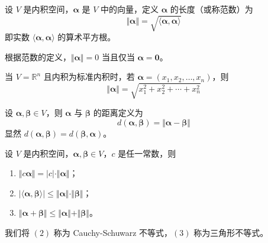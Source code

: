\begin{definition}
    设 $V$ 是内积空间，$\bm{\alpha}$ 是 $V$ 中的向量，定义 $\bm{\alpha}$ 的长度（或称范数）为
    \[
        \Vert \bm{\alpha} \Vert = \sqrt{\langle \bm{\alpha}, \bm{\alpha} \rangle}
    \]
    即实数 $\langle \bm{\alpha}, \bm{\alpha} \rangle$ 的算术平方根。
\end{definition}

\begin{remark}
    根据范数的定义，$\Vert \bm{\alpha} \Vert = 0$ 当且仅当 $\bm{\alpha} = \bm{0}$。
\end{remark}

\begin{remark}
    当 $V = \mathbb{R}^n$ 且内积为标准内积时，若 $\bm{\alpha} = (x_1, x_2, \ldots, x_n)$，则
    \[
        \Vert \bm{\alpha} \Vert = \sqrt{x_{1}^{2} + x_{2}^{2} + \cdots + x_{n}^{2}}
    \]
\end{remark}

\begin{remark}
    设 $\bm{\alpha}, \bm{\beta} \in V$，则 $\bm{\alpha}$ 与 $\bm{\beta}$ 的距离定义为
    \[
        d(\bm{\alpha}, \bm{\beta}) = \Vert \bm{\alpha} - \bm{\beta} \Vert
    \]
    显然 $d(\bm{\alpha}, \bm{\beta}) = d(\bm{\beta}, \bm{\alpha})$。
\end{remark}

\begin{theorem}
    设 $V$ 是内积空间，$\bm{\alpha}, \bm{\beta} \in V$，$c$ 是任一常数，则
    \begin{enumerate}
        \item $\Vert c \bm{\alpha} \Vert = \vert c \vert \cdot \Vert \bm{\alpha} \Vert $；
        \item $\vert \langle \bm{\alpha}, \bm{\beta} \rangle \vert \leqslant \Vert \bm{\alpha} \Vert \cdot \Vert \bm{\beta} \Vert $；
        \item $\Vert \bm{\alpha} + \bm{\beta} \Vert \leqslant \Vert \bm{\alpha} \Vert + \Vert \bm{\beta} \Vert $。
    \end{enumerate}
\end{theorem}

\begin{remark}
    我们将 $(2)$ 称为 Cauchy-Schuwarz 不等式，$(3)$ 称为三角形不等式。
\end{remark}

